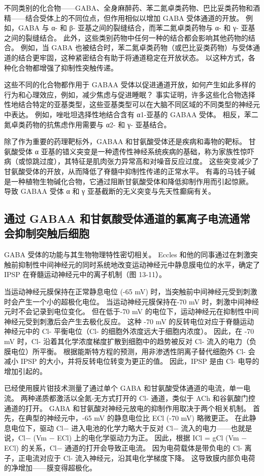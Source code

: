 不同类别的化合物——GABA、全身麻醉药、苯二氮卓类药物、巴比妥类药物和酒精——结合受体上的不同位点，但作用相似以增加 GABA 受体通道的开放。 
例如，GABA 与 α- 和 β- 亚基之间的裂缝结合，而苯二氮卓类药物与 α- 和 γ- 亚基之间的裂缝结合。 
此外，这些类别药物中任何一种的结合都会影响其他药物的结合。
例如，当 GABA 也被结合时，苯二氮卓类药物（或巴比妥类药物）与受体通道的结合更牢固，这种紧密结合有助于将通道稳定在开放状态。
以这种方式，各种化合物都增强了抑制性突触传递。


这些不同的化合物都作用于 GABAA 受体以促进通道开放，如何产生如此多样的行为和心理效应，例如，减少焦虑与促进睡眠？ 
事实证明，许多这些化合物选择性地结合特定的亚基类型，这些亚基类型可以在大脑不同区域的不同类型的神经元中表达。 
例如，唑吡坦选择性地结合含有 α1-亚基的 GABAA 受体。 
相反，苯二氮卓类药物的抗焦虑作用需要与 α2- 和 γ- 亚基结合。


除了作为重要的药理靶标外，GABAA 和甘氨酸受体还是疾病和毒物的靶标。
甘氨酸受体 α 亚基的错义突变是一种遗传性神经系统疾病的基础，称为家族性惊吓病（或惊跳过度），其特征是肌肉张力异常高和对噪音反应过度。
这些突变减少了甘氨酸受体的开放，从而降低了脊髓中抑制性传递的正常水平。 
有毒的马钱子碱是一种植物生物碱化合物，它通过阻断甘氨酸受体和降低抑制作用而引起惊厥。 
导致 GABAA 受体 α 和 γ 亚基截断的无义突变与先天性癫痫有关。


\subsection{通过 GABAA 和甘氨酸受体通道的氯离子电流通常会抑制突触后细胞}
GABA 受体的功能与其生物物理特性密切相关。 
Eccles 和他的同事通过在刺激突触前抑制性中间神经元的同时系统地改变运动神经元中静息膜电位的水平，确定了 IPSP 在脊髓运动神经元中的离子机制（图 13-11）。


当运动神经元膜保持在正常静息电位 (-65 mV) 时，当突触前中间神经元受到刺激时会产生一个小的超极化电位。 
当运动神经元膜保持在-70 mV 时，刺激中间神经元时不会记录到电位变化。 
但在低于-70 mV 的电位下，运动神经元在抑制性中间神经元受到刺激后会产生去极化反应。
这种 -70 mV 的反转电位对应于脊髓运动神经元中的 Cl- 平衡电位（Cl- 的细胞外浓度远大于细胞内浓度）。
因此，在 -70 mV 时，Cl- 沿着其化学浓度梯度扩散到细胞中的趋势被反对 Cl- 流入的电力（负膜电位）所平衡。
根据能斯特方程的预测，用非渗透性阴离子替代细胞外 Cl- 会减小 IPSP 的大小，并将反转电位转变为更正的值。
因此，IPSP 是由 Cl- 电导的增加引起的。


已经使用膜片钳技术测量了通过单个 GABA 和甘氨酸受体通道的电流，单一电流。 
两种递质都激活以全氮-无方式打开的 Cl- 通道，类似于 ACh 和谷氨酸门控通道的打开。 
GABA 和甘氨酸对神经元放电的抑制作用取决于两个相关机制。
首先，在典型的神经元中，-65 mV 的静息电位比 ECl (-70 mV) 略微更正。
在此静息电位下，驱动 Cl− 进入电池的化学力略大于反对 Cl− 流入的电力——也就是说，Cl− (Vm − ECl) 上的电化学驱动力为正。
因此，根据 ICl = gCl (Vm − ECl) 的关系，Cl− 通道的打开会导致正电流。 因为电荷载体是带负电的 Cl- 离子，正电流对应于 Cl- 流入神经元，沿其电化学梯度下降。
这导致膜内部负电荷的净增加——膜变得超极化。


